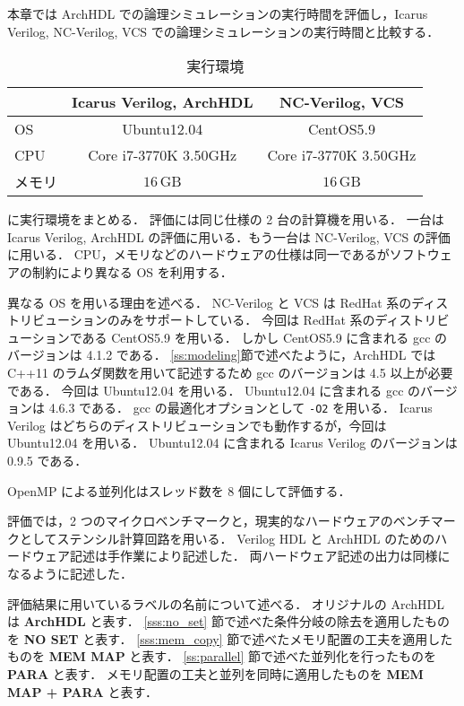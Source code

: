 本章では ArchHDL での論理シミュレーションの実行時間を評価し，Icarus Verilog, NC-Verilog, VCS での論理シミュレーションの実行時間と比較する．

\begin{table}[t]
 \caption{実行環境}
 \label{table:exec_env}
 \begin{center}
  \begin{tabular}{l|c|c} \hline
         &  Icarus Verilog, ArchHDL  &  NC-Verilog, VCS   \\ \hline
  OS     &  Ubuntu12.04             &  CentOS5.9        \\
  CPU    &  Core i7-3770K 3.50GHz   &  Core i7-3770K 3.50GHz  \\
  メモリ  &  $16\,\mathrm{GB}$       &  $16\,\mathrm{GB}$  \\ \hline
  \end{tabular}
 \end{center}
\end{table}

 に実行環境をまとめる．
評価には同じ仕様の 2 台の計算機を用いる．
一台は Icarus Verilog, ArchHDL の評価に用いる．もう一台は NC-Verilog, VCS の評価に用いる．
CPU，メモリなどのハードウェアの仕様は同一であるがソフトウェアの制約により異なる OS を利用する．

異なる OS を用いる理由を述べる．
NC-Verilog と VCS は RedHat 系のディストリビューションのみをサポートしている．
今回は RedHat 系のディストリビューションである CentOS5.9 を用いる．
しかし CentOS5.9 に含まれる gcc のバージョンは 4.1.2 である．
\ref{ss:modeling}節で述べたように，ArchHDL では C++11 のラムダ関数を用いて記述するため gcc のバージョンは 4.5 以上が必要である．
今回は Ubuntu12.04 を用いる．
Ubuntu12.04 に含まれる gcc のバージョンは 4.6.3 である．
gcc の最適化オプションとして \verb/-O2/ を用いる．
Icarus Verilog はどちらのディストリビューションでも動作するが，今回は Ubuntu12.04 を用いる．
Ubuntu12.04 に含まれる Icarus Verilog のバージョンは 0.9.5 である．

OpenMP による並列化はスレッド数を 8 個にして評価する．

評価では，2 つのマイクロベンチマークと，現実的なハードウェアのベンチマークとしてステンシル計算回路\cite{koba:stencil}を用いる．
Verilog HDL と ArchHDL のためのハードウェア記述は手作業により記述した．
両ハードウェア記述の出力は同様になるように記述した．

評価結果に用いているラベルの名前について述べる．
オリジナルの ArchHDL は \textbf{ArchHDL} と表す．
\ref{sss:no_set} 節で述べた条件分岐の除去を適用したものを \textbf{NO SET} と表す．
\ref{sss:mem_copy} 節で述べたメモリ配置の工夫を適用したものを \textbf{MEM MAP} と表す．
\ref{ss:parallel} 節で述べた並列化を行ったものを \textbf{PARA} と表す．
メモリ配置の工夫と並列を同時に適用したものを \textbf{MEM MAP + PARA} と表す．


